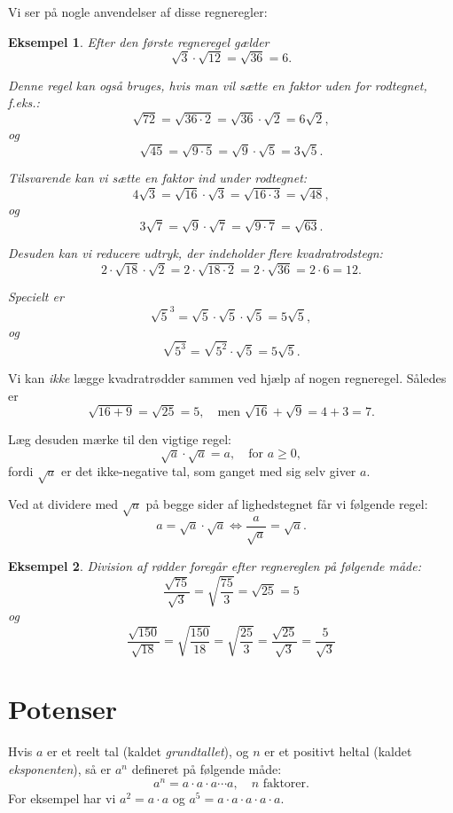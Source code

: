 \documentclass[12pt,oneside,a4paper]{article}
\theoremstyle{plain}
\newtheorem*{eks}{Eksempel}
\begin{document}
Vi ser på nogle anvendelser af disse regneregler:
\begin{eks}
    Efter den første regneregel gælder
    $$
    \sqrt{3} \cdot \sqrt{12} = \sqrt{36} = 6.
    $$
    
    Denne regel kan også bruges, hvis man vil sætte en faktor uden for rodtegnet, f.eks.:
    $$
    \sqrt{72} = \sqrt{36\cdot 2} = \sqrt{36} \cdot \sqrt{2} = 6\sqrt{2},
    $$
    og
    $$
    \sqrt{45} = \sqrt{9\cdot 5} = \sqrt{9} \cdot \sqrt{5} = 3\sqrt{5}.
    $$

    Tilsvarende kan vi sætte en faktor ind under rodtegnet:
    $$
    4\sqrt{3} = \sqrt{16} \cdot \sqrt{3} = \sqrt{16\cdot 3} = \sqrt{48},
    $$
    og
    $$
    3\sqrt{7} = \sqrt{9} \cdot \sqrt{7} = \sqrt{9\cdot 7} = \sqrt{63}.
    $$

    Desuden kan vi reducere udtryk, der indeholder flere kvadratrodstegn:
    $$
    2\cdot\sqrt{18} \cdot \sqrt{2} = 2\cdot\sqrt{18\cdot 2} = 2\cdot \sqrt{36}
    = 2\cdot 6 = 12.
    $$

    Specielt er
    $$
    {\sqrt{5}}^3 = \sqrt{5} \cdot \sqrt{5} \cdot \sqrt{5} = 5\sqrt{5},
    $$
    og
    $$
    \sqrt{5^3} = \sqrt{5^2} \cdot \sqrt{5} = 5\sqrt{5}.
    $$

\end{eks}

Vi kan {\em ikke} lægge kvadratrødder sammen ved hjælp af nogen regneregel.
Således er
$$
\sqrt{16+9} = \sqrt{25} = 5,\quad \mbox{men $\sqrt{16}+\sqrt{9} = 4+3 = 7$}.
$$

Læg desuden mærke til den vigtige regel:
$$
\sqrt{a} \cdot \sqrt{a} = a,\quad \mbox{for $a\ge 0$},
$$
fordi $\sqrt{a}$ er det ikke-negative tal, som ganget med sig selv giver $a$.

Ved at dividere med $\sqrt{a}$ på begge sider af lighedstegnet får vi følgende
regel:
$$
a = \sqrt{a}\cdot\sqrt{a} \Leftrightarrow \frac{a}{\sqrt{a}} = \sqrt{a}.
$$

\begin{eks}
    Division af rødder foregår efter regnereglen på følgende måde:
    $$
    \frac{\sqrt{75}}{\sqrt{3}} = \sqrt{\frac{75}{3}} = \sqrt{25} = 5
    $$
    og
    $$
    \frac{\sqrt{150}}{\sqrt{18}} = \sqrt{\frac{150}{18}} = \sqrt{\frac{25}{3}}
    = \frac{\sqrt{25}}{\sqrt{3}} = \frac{5}{\sqrt{3}}
    $$
\end{eks}


\section*{Potenser}
Hvis $a$ er et reelt tal (kaldet {\em grundtallet}), og $n$ er et positivt
heltal (kaldet {\em eksponenten}), så er $a^n$ defineret på følgende
måde:
$$
a^n = a \cdot a \cdot a \cdots a,\quad \mbox{$n$ faktorer}.
$$
For eksempel har vi $a^2 = a \cdot a$ og $a^5 = a \cdot a \cdot a \cdot a \cdot a$.
\end{document}
